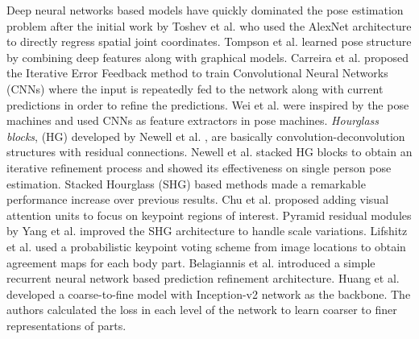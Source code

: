 \documentclass[runningheads]{llncs}
\begin{document}




Deep neural networks based models \cite{Toshev,Tompson,Carreira2015,Wei2016,Newella,Chu2017,Yang2011,Lifshitz2016,Huang,Belagiannis} have quickly dominated the pose estimation problem after the initial work by Toshev et al. \cite{Toshev} who used  the AlexNet architecture to directly regress spatial joint coordinates. Tompson et al. \cite{Tompson} learned pose structure by combining deep features along with graphical models. Carreira et al. \cite{Carreira2015} proposed the Iterative Error Feedback method to train Convolutional Neural Networks (CNNs) where the input is repeatedly fed to the network along with current predictions in order to refine the predictions. Wei et al.\cite{Wei2016} were inspired by the pose machines \cite{Ramakrishna2014} and used CNNs as feature extractors in pose machines.  \textit{Hourglass blocks}, (HG) developed by Newell et al. \cite{Newella}, are basically  convolution-deconvolution structures with  residual connections. Newell et al. stacked HG blocks to obtain an iterative refinement process and showed its effectiveness on single person pose estimation. Stacked Hourglass (SHG) based methods made a remarkable performance increase over previous results.  Chu et al. \cite{Chu2017} proposed  adding visual attention units to focus on keypoint regions of interest. Pyramid residual modules by Yang et al.\cite{Yang2011} improved the SHG architecture to handle  scale variations. Lifshitz et al. \cite{Lifshitz2016} used a probabilistic keypoint voting scheme from image locations to obtain agreement maps for each body part. Belagiannis et al. \cite{Belagiannis} introduced a simple recurrent neural network based prediction refinement architecture. Huang et al.\cite{Huang} developed a coarse-to-fine model with Inception-v2 \cite{Szegedy15} network as the backbone. The authors calculated the loss in each level of the network to learn coarser to finer representations of parts.
\end{document}
